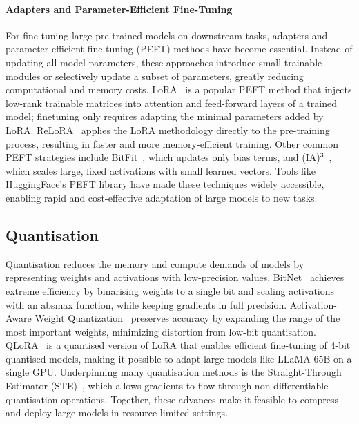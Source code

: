\paragraph{Adapters and Parameter-Efficient Fine-Tuning}

For fine-tuning large pre-trained models on downstream tasks, adapters and parameter-efficient fine-tuning (PEFT) methods have become essential. Instead of updating all model parameters, these approaches introduce small trainable modules or selectively update a subset of parameters, greatly reducing computational and memory costs. LoRA~\citep{hu2021lora} is a popular PEFT method that injects low-rank trainable matrices into attention and feed-forward layers of a trained model; finetuning only requires adapting the minimal parameters added by LoRA. ReLoRA~\citep{lialin2023relora} applies the LoRA methodology directly to the pre-training process, resulting in faster and more memory-efficient training. Other common PEFT strategies include BitFit~\citep{benzaken2022bitfit}, which updates only bias terms, and (IA)$^3$~\citep{liu2022few}, which scales large, fixed activations with small learned vectors. Tools like HuggingFace's PEFT library have made these techniques widely accessible, enabling rapid and cost-effective adaptation of large models to new tasks.



\subsection{Quantisation}
Quantisation reduces the memory and compute demands of models by representing weights and activations with low-precision values. BitNet~\citep{wang2023bitnet} achieves extreme efficiency by binarising weights to a single bit and scaling activations with an absmax function, while keeping gradients in full precision. Activation-Aware Weight Quantization~\citep{lin2023awq} preserves accuracy by expanding the range of the most important weights, minimizing distortion from low-bit quantisation. QLoRA~\citep{dettmers2023qlora} is a quantised version of LoRA that enables efficient fine-tuning of 4-bit quantised models, making it possible to adapt large models like LLaMA-65B on a single GPU. Underpinning many quantisation methods is the Straight-Through Estimator (STE)~\citep{bengio2013estimating}, which allows gradients to flow through non-differentiable quantisation operations. Together, these advances make it feasible to compress and deploy large models in resource-limited settings.

